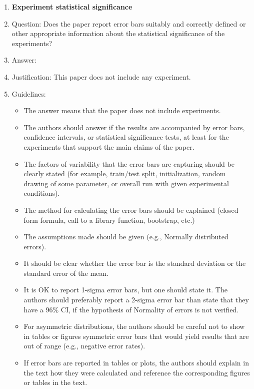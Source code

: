 \documentclass{article}
\theoremstyle{definition}
\theoremstyle{remark}
\begin{document}
\begin{enumerate}
\item {\bf Experiment statistical significance}
    \item[] Question: Does the paper report error bars suitably and correctly defined or other appropriate information about the statistical significance of the experiments?
    \item[] Answer: \answerNA{} %
    \item[] Justification: This paper does not include any experiment.
    \item[] Guidelines:
    \begin{itemize}
        \item The answer \answerNA{} means that the paper does not include experiments.
        \item The authors should answer \answerYes{} if the results are accompanied by error bars, confidence intervals, or statistical significance tests, at least for the experiments that support the main claims of the paper.
        \item The factors of variability that the error bars are capturing should be clearly stated (for example, train/test split, initialization, random drawing of some parameter, or overall run with given experimental conditions).
        \item The method for calculating the error bars should be explained (closed form formula, call to a library function, bootstrap, etc.)
        \item The assumptions made should be given (e.g., Normally distributed errors).
        \item It should be clear whether the error bar is the standard deviation or the standard error of the mean.
        \item It is OK to report 1-sigma error bars, but one should state it. The authors should preferably report a 2-sigma error bar than state that they have a 96\% CI, if the hypothesis of Normality of errors is not verified.
        \item For asymmetric distributions, the authors should be careful not to show in tables or figures symmetric error bars that would yield results that are out of range (e.g., negative error rates).
        \item If error bars are reported in tables or plots, the authors should explain in the text how they were calculated and reference the corresponding figures or tables in the text.
    \end{itemize}


\end{enumerate}
\end{document}
